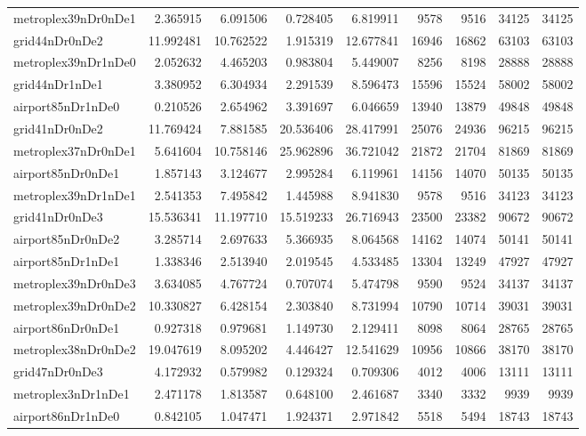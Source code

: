 \begin{longtable}{|l|r|r|r|r|r|r|r|r|}
metroplex39nDr0nDe1 & 2.365915 & 6.091506 & 0.728405 & 6.819911 & 9578 & 9516 & 34125 & 34125 \\
grid44nDr0nDe2 & 11.992481 & 10.762522 & 1.915319 & 12.677841 & 16946 & 16862 & 63103 & 63103 \\
metroplex39nDr1nDe0 & 2.052632 & 4.465203 & 0.983804 & 5.449007 & 8256 & 8198 & 28888 & 28888 \\
grid44nDr1nDe1 & 3.380952 & 6.304934 & 2.291539 & 8.596473 & 15596 & 15524 & 58002 & 58002 \\
airport85nDr1nDe0 & 0.210526 & 2.654962 & 3.391697 & 6.046659 & 13940 & 13879 & 49848 & 49848 \\
grid41nDr0nDe2 & 11.769424 & 7.881585 & 20.536406 & 28.417991 & 25076 & 24936 & 96215 & 96215 \\
metroplex37nDr0nDe1 & 5.641604 & 10.758146 & 25.962896 & 36.721042 & 21872 & 21704 & 81869 & 81869 \\
airport85nDr0nDe1 & 1.857143 & 3.124677 & 2.995284 & 6.119961 & 14156 & 14070 & 50135 & 50135 \\
metroplex39nDr1nDe1 & 2.541353 & 7.495842 & 1.445988 & 8.941830 & 9578 & 9516 & 34123 & 34123 \\
grid41nDr0nDe3 & 15.536341 & 11.197710 & 15.519233 & 26.716943 & 23500 & 23382 & 90672 & 90672 \\
airport85nDr0nDe2 & 3.285714 & 2.697633 & 5.366935 & 8.064568 & 14162 & 14074 & 50141 & 50141 \\
airport85nDr1nDe1 & 1.338346 & 2.513940 & 2.019545 & 4.533485 & 13304 & 13249 & 47927 & 47927 \\
metroplex39nDr0nDe3 & 3.634085 & 4.767724 & 0.707074 & 5.474798 & 9590 & 9524 & 34137 & 34137 \\
metroplex39nDr0nDe2 & 10.330827 & 6.428154 & 2.303840 & 8.731994 & 10790 & 10714 & 39031 & 39031 \\
airport86nDr0nDe1 & 0.927318 & 0.979681 & 1.149730 & 2.129411 & 8098 & 8064 & 28765 & 28765 \\
metroplex38nDr0nDe2 & 19.047619 & 8.095202 & 4.446427 & 12.541629 & 10956 & 10866 & 38170 & 38170 \\
grid47nDr0nDe3 & 4.172932 & 0.579982 & 0.129324 & 0.709306 & 4012 & 4006 & 13111 & 13111 \\
metroplex3nDr1nDe1 & 2.471178 & 1.813587 & 0.648100 & 2.461687 & 3340 & 3332 & 9939 & 9939 \\
airport86nDr1nDe0 & 0.842105 & 1.047471 & 1.924371 & 2.971842 & 5518 & 5494 & 18743 & 18743 \\

\end{longtable}
